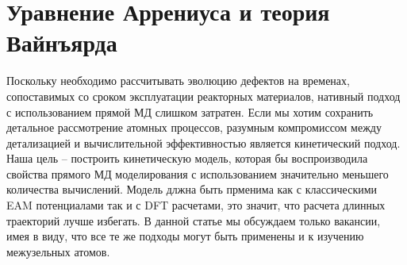 \documentclass[master,14pt,subf,href,colorlinks=true
]{disser}
\begin{document}
\section{Уравнение Аррениуса и теория Вайнъярда}\label{chapter_kinetics}
Поскольку необходимо рассчитывать эволюцию дефектов на временах, сопоставимых со сроком эксплуатации реакторных материалов, нативный подход с использованием прямой МД слишком затратен. Если мы хотим сохранить детальное рассмотрение атомных процессов, разумным компромиссом между детализацией и вычислительной эффективностью является кинетический подход.
Наша цель -- построить кинетическую модель, которая бы воспроизводила свойства прямого МД моделирования с использованием значительно меньшего количества вычислений. Модель длжна быть прменима как с классическими EAM потенциалами так и с DFT расчетами, это значит, что расчета длинных траекторий лучше избегать.
В данной статье мы обсуждаем только вакансии, имея в виду, что все те же подходы могут быть применены и к изучению межузельных атомов.
\end{document}

